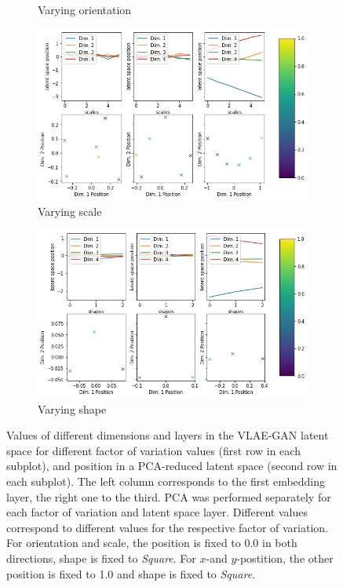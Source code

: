 \documentclass[11pt,a4paper]{article}
\begin{document}
\begin{figure}
\begin{subfigure}{.48\textwidth}
\caption{Varying orientation}
\end{subfigure}
\hfill
\begin{subfigure}{.48\textwidth}
\centering
\includegraphics[width=\textwidth]{images/latent_space_traversals/vlae_gan_dsprites_scale_latent_space_values.png}
\caption{Varying scale}
\end{subfigure}
\vfill
\begin{subfigure}{.48\textwidth}
\centering
\includegraphics[width=\textwidth]{images/latent_space_traversals/vlae_gan_dsprites_shape_latent_space_values.png}
\caption{Varying shape}
\end{subfigure}
\caption[\ac{VLAE}-\ac{GAN} on dsprites: Latent Space Values]{Values of different dimensions and layers in the \ac{VLAE}-\ac{GAN} latent space for different factor of variation values (first row in each subplot), and position in a \ac{PCA}-reduced latent space (second row in each subplot). The left column corresponds to the first embedding layer, the right one to the third. \ac{PCA} was performed separately for each factor of variation and latent space layer. Different values correspond to different values for the respective factor of variation. For orientation and scale, the position is fixed to 0.0 in both directions, shape is fixed to \textit{Square}. For $x$-and $y$-postition, the other position is fixed to 1.0 and shape is fixed to \textit{Square}.}
\label{fig:vlae_gan_dsprites_latent_space_values}
\end{figure}
\end{document}
